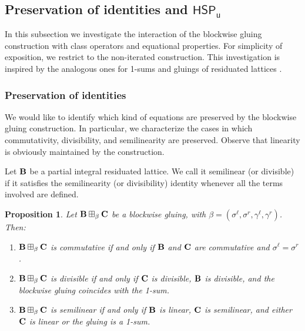 \documentclass{amsart}
\newtheorem{proposition}[theorem]{Proposition}
\theoremstyle{definition}
\numberwithin{equation}{section}
\newcommand{\alg}[1]{{\textbf{\upshape #1}}}  %
\newcommand{\vv}[1]{\mathsf {#1}}
\newcommand{\sell}{\sigma^\ell}
\newcommand{\sr}{\sigma^r}
\newcommand{\gell}{\gamma^\ell}
\newcommand{\gr}{\gamma^r}
\begin{document}
\subsection{Preservation of identities and $\vv{HSP_u}$}
In this subsection we investigate the interaction of the blockwise gluing construction with class operators and equational properties. For simplicity of exposition, we restrict to the non-iterated construction. This investigation is inspired by the analogous ones for 1-sums \cite{AM2003} and gluings of residuated lattices \cite{GalatosUgolini}.

\subsubsection{Preservation of identities} We would like to identify which kind of equations are preserved by the blockwise gluing construction. In particular, we characterize the cases in which commutativity, divisibility, and semilinearity are preserved. Observe that linearity is obviously maintained by the construction. 

Let $\alg B$ be a partial integral residuated lattice. We call it semilinear (or divisible) if it satisfies the semilinearity (or divisibility) identity whenever all the terms involved are defined.
 \begin{proposition}
	Let $\alg B \boxplus_\beta \alg C$ be a blockwise gluing, with $\beta =(\sell, \sr, \gell, \gr)$. Then:
	\begin{enumerate}
		\item $\alg B \boxplus_\beta \alg C$ is commutative if and only if $\alg B$ and $\alg C$ are commutative and $\sell=\sr$. 
		\item $\alg B \boxplus_\beta \alg C$ is divisible if and only if $\alg C$ is divisible, $\alg B$ is divisible, and the blockwise gluing coincides with the 1-sum. 
		\item $\alg B \boxplus_\beta \alg C$ is semilinear if and only if $\alg B$ is linear, $\alg C$ is semilinear, and either $\alg C$ is linear or the gluing is a 1-sum.
	\end{enumerate}
\end{proposition}
\end{document}
